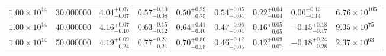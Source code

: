 \begin{tabular}{lrlllllll}
$1.00 \times 10^{14}$ & 30.000000 & $4.04^{+0.07}_{-0.07}$ & $0.57^{+0.10}_{-0.08}$ & $0.50^{+0.29}_{-0.25}$ & $0.54^{+0.05}_{-0.04}$ & $0.22^{+0.04}_{-0.04}$ & $0.00^{+0.13}_{-0.14}$ & $6.76 \times 10^{105}$ \\
$1.00 \times 10^{14}$ & 40.000000 & $4.16^{+0.07}_{-0.10}$ & $0.63^{+0.15}_{-0.12}$ & $0.64^{+0.41}_{-0.40}$ & $0.47^{+0.06}_{-0.04}$ & $0.16^{+0.05}_{-0.05}$ & $-0.15^{+0.18}_{-0.17}$ & $9.35 \times 10^{75}$ \\
$1.00 \times 10^{14}$ & 50.000000 & $4.19^{+0.09}_{-0.24}$ & $0.77^{+0.27}_{-0.21}$ & $0.70^{+0.86}_{-0.58}$ & $0.46^{+0.12}_{-0.05}$ & $0.12^{+0.09}_{-0.07}$ & $-0.18^{+0.24}_{-0.28}$ & $2.37 \times 10^{63}$ \\
\bottomrule
\end{tabular}
